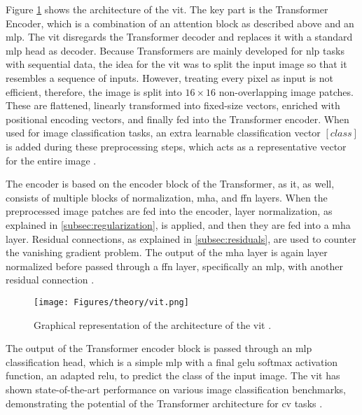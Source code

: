 Figure \ref{fig:vit} shows the architecture of the \gls{vit}. The key part is the Transformer Encoder, which is a combination of an attention block as described above and an \gls{mlp}. The \gls{vit} disregards the Transformer decoder and replaces it with a standard \gls{mlp} head as decoder. Because Transformers are mainly developed for \gls{nlp} tasks with sequential data, the idea for the \gls{vit} was to split the input image so that it resembles a sequence of inputs. However, treating every pixel as input is not efficient, therefore, the image is split into \( 16 \times 16 \) non-overlapping image patches. These are flattened, linearly transformed into fixed-size vectors, enriched with positional encoding vectors, and finally fed into the Transformer encoder. When used for image classification tasks, an extra learnable classification vector \( [class] \) is added during these preprocessing steps, which acts as a representative vector for the entire image \autocite{Han.Wang.ea2023,Khan.Naseer.ea2021,Liu.Zhang.ea2024,Park.Kim2022,Szeliski2022}.

The encoder is based on the encoder block of the Transformer, as it, as well, consists of multiple blocks of normalization, \gls{mha}, and \gls{ffn} layers. When the preprocessed image patches are fed into the encoder, layer normalization, as explained in \ref{subsec:regularization}, is applied, and then they are fed into a \gls{mha} layer. Residual connections, as explained in \ref{subsec:residuals}, are used to counter the vanishing gradient problem. The output of the \gls{mha} layer is again layer normalized before passed through a \gls{ffn} layer, specifically an \gls{mlp}, with another residual connection \autocite{Dosovitskiy.Beyer.ea2020,Geva.Schuster.ea2021,Liu.Zhang.ea2024,Park.Kim2022,Szeliski2022,Zhang.Lipton.ea2023}.

\begin{figure}[htb]
    \centering
    \texttt{[image: Figures/theory/vit.png]}
    \caption[ Architecture]{Graphical representation of the architecture of the \gls{vit} \autocite{Dosovitskiy.Beyer.ea2020}.}
    \label{fig:vit}
\end{figure}

The output of the Transformer encoder block is passed through an \gls{mlp} classification head, which is a simple \gls{mlp} with a final \gls{gelu} softmax activation function, an adapted \gls{relu}, to predict the class of the input image. The \gls{vit} has shown state-of-the-art performance on various image classification benchmarks, demonstrating the potential of the Transformer architecture for \gls{cv} tasks \autocite{Dosovitskiy.Beyer.ea2020,Geva.Schuster.ea2021,Liu.Zhang.ea2024,Park.Kim2022,Szeliski2022}.

